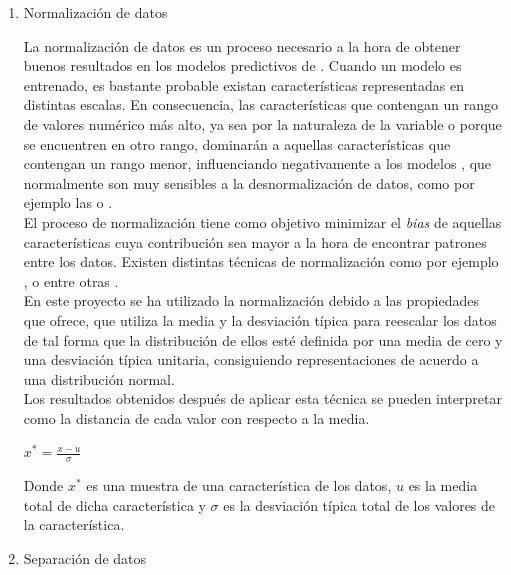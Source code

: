 \begin{enumerate}
                \item Normalización de datos

                    La normalización de datos es un proceso necesario a la hora de obtener buenos resultados en los modelos predictivos de . Cuando un modelo es entrenado, es bastante probable existan características representadas en distintas escalas. En consecuencia, las características que contengan un rango de valores numérico más alto, ya sea por la naturaleza de la variable o porque se encuentren en otro rango, dominarán a aquellas características que contengan un rango menor, influenciando negativamente a los modelos , que normalmente son muy sensibles a la desnormalización de datos, como por ejemplo las  o  \cite{NormalizationSensitiveModels}.\\

                    El proceso de normalización tiene como objetivo minimizar el \textit{bias} de aquellas características cuya contribución sea mayor a la hora de encontrar patrones entre los datos. Existen distintas técnicas de normalización como por ejemplo ,  o  entre otras \cite{DataNormalizationInvestigation}.\\


                    En este proyecto se ha utilizado la normalización  debido a las propiedades que ofrece,  que utiliza la media y la desviación típica para reescalar los datos de tal forma que la distribución de ellos esté definida por una media de cero y una desviación típica unitaria, consiguiendo representaciones de acuerdo a una distribución normal.\\

                    Los resultados obtenidos después de aplicar esta técnica se pueden interpretar como la distancia de cada valor con respecto a la media.

                   \begin{center}
                        $x^* = \frac{x - u}{\sigma}$
                    \end{center}


                    Donde $x^*$ es una muestra de una característica de los datos, $u$ es la media total de dicha característica y $\sigma$ es la desviación típica total de los valores de la característica.


                \item Separación de datos


\end{enumerate}
